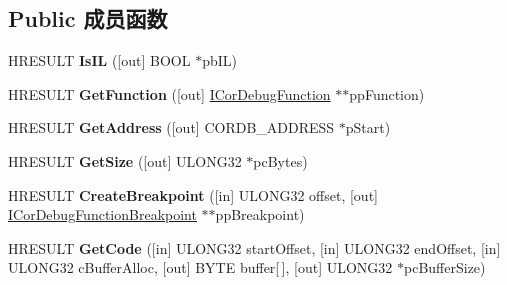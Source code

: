 \subsection*{Public 成员函数}
\begin{DoxyCompactItemize}
\item 
\mbox{\label{interface_i_cor_debug_code_a4747750385227cb7db18837c864ba855}} 
H\+R\+E\+S\+U\+LT {\bfseries Is\+IL} (\mbox{[}out\mbox{]} B\+O\+OL $\ast$pb\+IL)
\item 
\mbox{\label{interface_i_cor_debug_code_a5476762aee7cad2d0da7afc89d9ef860}} 
H\+R\+E\+S\+U\+LT {\bfseries Get\+Function} (\mbox{[}out\mbox{]} \hyperlink{interface_i_cor_debug_function}{I\+Cor\+Debug\+Function} $\ast$$\ast$pp\+Function)
\item 
\mbox{\label{interface_i_cor_debug_code_a3d1f06ebe317f046ba1a74472fdadf98}} 
H\+R\+E\+S\+U\+LT {\bfseries Get\+Address} (\mbox{[}out\mbox{]} C\+O\+R\+D\+B\+\_\+\+A\+D\+D\+R\+E\+SS $\ast$p\+Start)
\item 
\mbox{\label{interface_i_cor_debug_code_ad4f6596b2d4cf765ea427bcb00212090}} 
H\+R\+E\+S\+U\+LT {\bfseries Get\+Size} (\mbox{[}out\mbox{]} U\+L\+O\+N\+G32 $\ast$pc\+Bytes)
\item 
\mbox{\label{interface_i_cor_debug_code_a0374555edc9d2b54cbb02ba43b0f64a0}} 
H\+R\+E\+S\+U\+LT {\bfseries Create\+Breakpoint} (\mbox{[}in\mbox{]} U\+L\+O\+N\+G32 offset, \mbox{[}out\mbox{]} \hyperlink{interface_i_cor_debug_function_breakpoint}{I\+Cor\+Debug\+Function\+Breakpoint} $\ast$$\ast$pp\+Breakpoint)
\item 
\mbox{\label{interface_i_cor_debug_code_a34f5ddb19792cb58cb2240170e03b145}} 
H\+R\+E\+S\+U\+LT {\bfseries Get\+Code} (\mbox{[}in\mbox{]} U\+L\+O\+N\+G32 start\+Offset, \mbox{[}in\mbox{]} U\+L\+O\+N\+G32 end\+Offset, \mbox{[}in\mbox{]} U\+L\+O\+N\+G32 c\+Buffer\+Alloc, \mbox{[}out\mbox{]} B\+Y\+TE buffer\mbox{[}$\,$\mbox{]}, \mbox{[}out\mbox{]} U\+L\+O\+N\+G32 $\ast$pc\+Buffer\+Size)
\item 
\mbox{\label{interface_i_cor_debug_code_a1a88532e36d0a7ed180375783623de29}} 

\end{DoxyCompactItemize}
